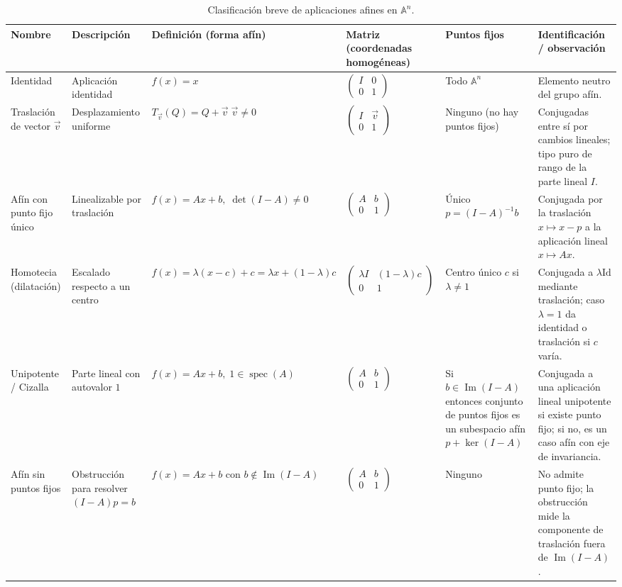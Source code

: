 \begin{table}[h]
\centering
\small
\begin{tabular}{|p{2.4cm}|p{2.8cm}|p{3.0cm}|p{3.4cm}|p{2.8cm}|p{2.8cm}|}
\hline
Nombre & Descripción & Definición (forma afín) & Matriz (coordenadas homogéneas) & Puntos fijos & Identificación / observación \\
\hline
Identidad & Aplicación identidad & $f(x)=x$ & $\displaystyle\begin{pmatrix} I & 0\\[2pt] 0 & 1\end{pmatrix}$ & Todo $\mathbb{A}^n$ & Elemento neutro del grupo afín. \\
\hline
Traslación de vector $\vec{v}$ & Desplazamiento uniforme & $T_{\vec{v}}(Q) = Q + \vec{v} \; \vec{v}\neq 0$ & $\displaystyle\begin{pmatrix} I & \vec{v}\\[2pt] 0 & 1\end{pmatrix}$ & Ninguno (no hay puntos fijos) & Conjugadas entre sí por cambios lineales; tipo puro de rango de la parte lineal $I$. \\
\hline
Afín con punto fijo único & Linealizable por traslación & $f(x)=A x + b,\; \det(I-A)\neq0$ & $\displaystyle\begin{pmatrix} A & b\\[2pt] 0 & 1\end{pmatrix}$ & Único $p=(I-A)^{-1}b$ & Conjugada por la traslación $x\mapsto x-p$ a la aplicación lineal $x\mapsto A x$. \\
\hline
Homotecia (dilatación) & Escalado respecto a un centro & $f(x)=\lambda(x-c)+c=\lambda x+(1-\lambda)c$ & $\displaystyle\begin{pmatrix} \lambda I & (1-\lambda)c\\[2pt] 0 & 1\end{pmatrix}$ & Centro único $c$ si $\lambda\neq1$ & Conjugada a $\lambda\mathrm{Id}$ mediante traslación; caso $\lambda=1$ da identidad o traslación si $c$ varía. \\
\hline
Unipotente / Cizalla & Parte lineal con autovalor $1$ & $f(x)=A x + b,\;1\in\operatorname{spec}(A)$ & $\displaystyle\begin{pmatrix} A & b\\[2pt] 0 & 1\end{pmatrix}$ & Si $b\in\operatorname{Im}(I-A)$ entonces conjunto de puntos fijos es un subespacio afín $p+\ker(I-A)$ & Conjugada a una aplicación lineal unipotente si existe punto fijo; si no, es un caso afín con eje de invariancia. \\
\hline
Afín sin puntos fijos & Obstrucción para resolver $(I-A)p=b$ & $f(x)=A x + b$ con $b\notin\operatorname{Im}(I-A)$ & $\displaystyle\begin{pmatrix} A & b\\[2pt] 0 & 1\end{pmatrix}$ & Ninguno & No admite punto fijo; la obstrucción mide la componente de traslación fuera de $\operatorname{Im}(I-A)$. \\
\hline
\end{tabular}
\caption{Clasificación breve de aplicaciones afines en $\mathbb{A}^n$.}
\end{table}